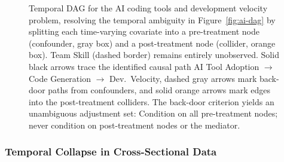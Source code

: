 \begin{figure}[t]
\caption{Temporal DAG for the AI coding tools and development velocity problem, resolving the temporal ambiguity in Figure~\ref{fig:ai-dag} by splitting each time-varying covariate into a pre-treatment node (confounder, gray box) and a post-treatment node (collider, orange box).
Team Skill (dashed border) remains entirely unobserved.
Solid black arrows trace the identified causal path AI Tool Adoption $\to$ Code Generation $\to$ Dev.\ Velocity, dashed gray arrows mark back-door paths from confounders, and solid orange arrows mark edges into the post-treatment colliders.
The back-door criterion yields an unambiguous adjustment set: Condition on all pre-treatment nodes; never condition on post-treatment nodes or the mediator.}
\label{fig:temporal-dag}
\end{figure}

\subsubsection{Temporal Collapse in Cross-Sectional Data}
\label{sec:temporal-collapse}

